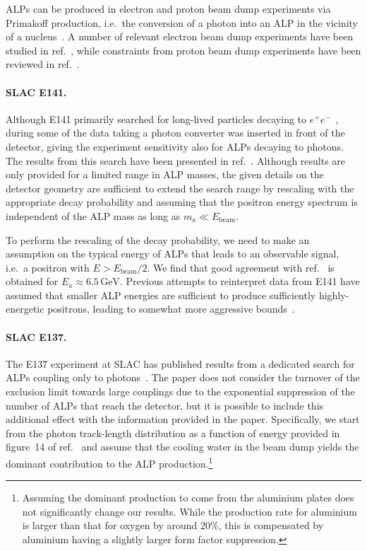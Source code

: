 \documentclass[11pt,a4paper]{article}
\begin{document}
ALPs can be produced in electron and proton beam dump experiments via Primakoff production, i.e.\ the conversion of a photon into an ALP in the vicinity of a nucleus~\cite{Tsai:1986tx}. A number of relevant electron beam dump experiments have been studied in ref.~\cite{Bjorken:2009mm}, while constraints from proton beam dump experiments have been reviewed in ref.~\cite{Dobrich:2015jyk}.

\paragraph{SLAC E141.}
Although E141 primarily searched for long-lived particles decaying to $e^+ e^-$~\cite{Riordan:1987aw}, during some of the data taking a photon converter was inserted in front of the detector, giving the experiment sensitivity also for ALPs decaying to photons. The results from this search have been presented in ref.~\cite{Krasny,Dobrich:2017gcm}. Although results are only provided for a limited range in ALP masses, the given details on the detector geometry are sufficient to extend the search range by rescaling with the appropriate decay probability and assuming that the positron energy spectrum is independent of the ALP mass as long as $m_a \ll E_\text{beam}$.

To perform the rescaling of the decay probability, we need to make an assumption on the typical energy of ALPs that leads to an observable signal, i.e.\ a positron with $E > E_\text{beam} / 2$. We find that good agreement with ref.~\cite{Krasny} is obtained for $E_a \approx 6.5 \, \text{GeV}$. Previous attempts to reinterpret data from E141 have assumed that smaller ALP energies are sufficient to produce sufficiently highly-energetic positrons, leading to somewhat more aggressive bounds~\cite{Hewett:2012ns}.

\paragraph{SLAC E137.}
The E137 experiment at SLAC has published results from a dedicated search for ALPs coupling only to photons~\cite{Bjorken:1988as}. The paper does not consider the turnover of the exclusion limit towards large couplings due to the exponential suppression of the number of ALPs that reach the detector, but it is possible to include this additional effect with the information provided in the paper. Specifically, we start from the photon track-length distribution as a function of energy provided in figure~14 of ref.~\cite{Bjorken:1988as} and assume that the cooling water in the beam dump yields the dominant contribution to the ALP production.\footnote{Assuming the dominant production to come from the aluminium plates does not significantly change our results. While the production rate for aluminium is larger than that for oxygen by around 20\%, this is compensated by aluminium having a slightly larger form factor suppression.}
\end{document}
